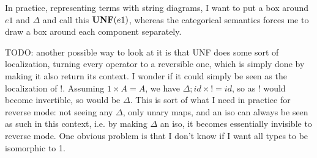 In practice, representing terms with string diagrams, I want to put a box around $e1$ and $\Delta$ and call this $\mathbf{UNF}(e1)$, whereas the categorical semantics forces me to draw a box around each component separately. 

TODO: another possible way to look at it is that UNF does some sort of localization, turning every operator to a reversible one, which is simply done by making it also return its context. I wonder if it could simply be seen as the localization of $!$. Assuming $1\times A=A$, we have $\Delta;id\times !=id$, so as $!$ would become invertible, so would be $\Delta$. This is sort of what I need in practice for reverse mode: not seeing any $\Delta$, only unary maps, and an iso can always be seen as such in this context, i.e. by making $\Delta$ an iso, it becomes essentially invisible to reverse mode. One obvious problem is that I don't know if I want all types to be isomorphic to 1.


